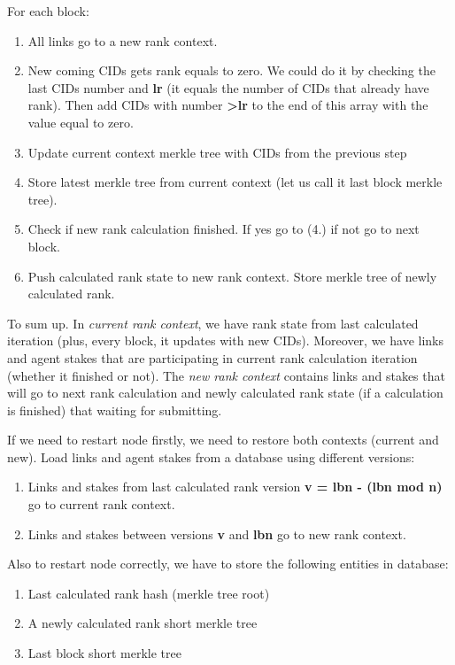 \documentclass[10pt,oneside]{amsart}
\newcommand{\code}[1]{\textbf{#1}}
\begin{document}
For each block:

\begin{enumerate}
  \item All links go to a new rank context.
  \item New coming CIDs gets rank equals to zero. We could do it by checking the last CIDs number and \code{lr} (it equals the number of CIDs that already have rank). Then add CIDs with number \code{>lr} to the end of this array with the value equal to zero.
  \item Update current context merkle tree with CIDs from the previous step
  \item Store latest merkle tree from current context (let us call it last block merkle tree).
  \item Check if new rank calculation finished. If yes go to (4.) if not go to next block.
  \item Push calculated rank state to new rank context. Store merkle tree of newly calculated rank.
\end{enumerate}
To sum up. In \textit{current rank context}, we have rank state from last calculated iteration (plus, every block, it updates with new CIDs). Moreover, we have links and agent stakes that are participating in current rank calculation iteration (whether it finished or not). The \textit{new rank context} contains links and stakes that will go to next rank calculation and newly calculated rank state (if a calculation is finished) that waiting for submitting.

If we need to restart node firstly, we need to restore both contexts (current and new).
Load links and agent stakes from a database using different versions:

\begin{enumerate}
  \item Links and stakes from last calculated rank version \code{v = lbn - (lbn mod n)} go to current rank context.
  \item Links and stakes between versions \code{v} and \code{lbn} go to new rank context.
\end{enumerate}

Also to restart node correctly, we have to store the following entities in database:

\begin{enumerate}
  \item Last calculated rank hash (merkle tree root)
  \item A newly calculated rank short merkle tree
  \item Last block short merkle tree
\end{enumerate}
\end{document}
